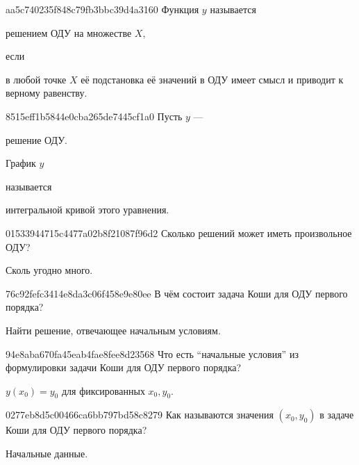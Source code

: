 \begin{note}{aa5c740235f848c79fb3bbc39d4a3160}
    Функция \({ y }\) называется \begin{icloze}{2}решением ОДУ на множестве \({ X }\),\end{icloze} если \begin{icloze}{1}в любой точке \({ X }\) её подстановка её значений в ОДУ имеет смысл и приводит к верному равенству.\end{icloze}
\end{note}

\begin{note}{8515eff1b5844e0cba265de7445cf1a0}
    Пусть \({ y }\) --- \begin{icloze}{3}решение ОДУ.\end{icloze}
    \begin{icloze}{1}График \({ y }\)\end{icloze} называется \begin{icloze}{2}интегральной кривой этого уравнения.\end{icloze}
\end{note}

\begin{note}{01533944715c4477a02b8f21087f96d2}
    Сколько решений может иметь произвольное ОДУ?

    \begin{cloze}{1}
        Сколь угодно много.
    \end{cloze}
\end{note}

\begin{note}{76c92fefc3414e8da3c06f458e9e80ee}
    В чём состоит задача Коши для ОДУ первого порядка?

    \begin{cloze}{1}
        Найти решение, отвечающее начальным условиям.
    \end{cloze}
\end{note}

\begin{note}{94e8aba670fa45eab4fae8fee8d23568}
    Что есть ``начальные условия'' из формулировки задачи Коши для ОДУ первого порядка?

    \begin{cloze}{1}
        \({ y(x_0) = y_0 }\) для фиксированных \({ x_0, y_0 }\).
    \end{cloze}
\end{note}

\begin{note}{0277eb8d5c00466ca6bb797bd58c8279}
    Как называются значения \({ (x_0, y_0) }\) в задаче Коши для ОДУ первого порядка?

    \begin{cloze}{1}
        Начальные данные.
    \end{cloze}
\end{note}

